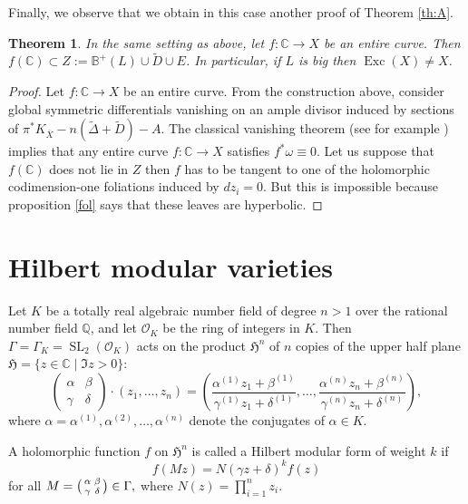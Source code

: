 \documentclass[JEP,XML,SOM,Unicode]{cedram}
\let\mathcal\mathscr
\newenvironment{smallpmatrix}{\big(\begin{smallmatrix}}{\end{smallmatrix}\big)}
\theoremstyle{plain}
\newtheorem{theorem}{Theorem}[section]
\theoremstyle{definition}
\numberwithin{equation}{theorem}
\DeclareMathOperator{\Exc}{Exc}
\DeclareMathOperator{\SL}{{SL}}
\let\wtilde\widetilde
\newcommand\CC{\mathbb C}
\newcommand\BB{\mathbb B}
\newcommand\QQ{\mathbb Q}
\newcommand\HH{\mathfrak H}
\begin{document}
Finally, we observe that we obtain in this case another proof of Theorem \ref{th:A}.

\begin{theorem}\label{entire}
In the same setting as above, let $f:\CC \to X$ be an entire curve. Then $f(\CC) \subset Z:=\BB^+(L) \cup \widetilde{D} \cup E$. In particular, if $L$ is big then $\Exc(X) \neq X$.
\end{theorem}

\begin{proof}
Let $f:\CC \to X$ be an entire curve. From the construction above, consider global symmetric differentials vanishing on an ample divisor induced by sections of $\pi^*K_{\overline{X}}-n(\wtilde {\Delta} + \widetilde{D})-A$. The classical vanishing theorem (see for example \cite[Cor.\,7.9]{De95}) implies that any entire curve $f: \CC \to X$ satisfies $f^*\omega \equiv 0$. Let us suppose that $f(\CC)$ does not lie in $Z$ then $f$ has to be tangent to one of the holomorphic codimension-one foliations induced by $dz_i=0$. But this is impossible because proposition \ref{fol} says that these leaves are hyperbolic.
\end{proof}

\section{Hilbert modular varieties}\label{HMV}

Let $K$ be a totally real algebraic number field of degree $n>1$ over the rational number field $\QQ$, and let $\mathcal{O}_K$ be the ring of integers in $K$. Then $\Gamma=\Gamma_K=\SL_2(\mathcal{O}_K)$ acts on the product $\HH^n$ of $n$ copies of the upper half plane $\HH=\{z \in \CC \mid \Im z > 0\}$:
$$\begin{pmatrix}\alpha & \beta \\ \gamma & \delta \end{pmatrix}\cdot(z_1,\dots,z_n)=\left(\frac{\alpha^{(1)}z_1+\beta^{(1)}} {\gamma^{(1)}z_1+\delta^{(1)}},\dots,
\frac{\alpha^{(n)}z_n+\beta^{(n)}}{\gamma^{(n)}z_n+\delta^{(n)}}
\right),$$
where $\alpha=\alpha^{(1)}, \alpha^{(2)}, \dots, \alpha^{(n)}$ denote the conjugates of $\alpha \in K$.

A holomorphic function $f$ on $\HH^n$ is called a Hilbert modular form of weight $k$ if
$$f(Mz)=N(\gamma z+\delta)^kf(z)$$
for all $M=\begin{smallpmatrix}\alpha & \beta \\ \gamma & \delta \end{smallpmatrix}\in \Gamma,$ where $N(z)=\prod_{i=1}^n z_i$.
\end{document}
